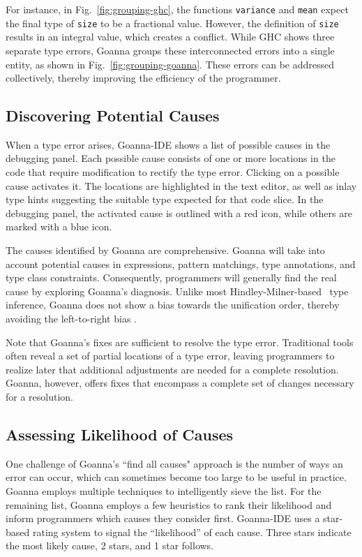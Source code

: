 \documentclass[pdflatex,lineno,sn-nature,Numbered]{sn-jnl}%
\begin{document}
    For instance, in Fig.~\ref{fig:grouping-ghc}, the functions \texttt{variance} and \texttt{mean} expect the final type of \texttt{size} to be a fractional value. However, the definition of \texttt{size} results in an integral value, which creates a conflict. While GHC shows three separate type errors, Goanna groups these interconnected errors into a single entity, as shown in Fig.~\ref{fig:grouping-goanna}. These errors can be addressed collectively, thereby improving the efficiency of the programmer.

    \subsection{Discovering Potential Causes} \label{sub:suggesting}
    When a type error arises, Goanna-IDE shows a list of possible causes in the debugging panel. Each possible cause consists of one or more locations in the code that require modification to rectify the type error. Clicking on a possible cause activates it. The locations are highlighted in the text editor, as well as inlay type hints suggesting the suitable type expected for that code slice. In the debugging panel, the activated cause is outlined with a red icon, while others are marked with a blue icon. 

    The causes identified by Goanna are comprehensive. Goanna will take into account potential causes in expressions, pattern matchings, type annotations, and type class constraints. Consequently, programmers will generally find the real cause by exploring Goanna's diagnosis. Unlike most Hindley-Milner-based~\cite{Damas1982-zw} type inference, Goanna does not show a bias towards the unification order, thereby avoiding the left-to-right bias \cite{Chen2014-ev}. 
    
    Note that Goanna's fixes are sufficient to resolve the type error. Traditional tools often reveal a set of partial locations of a type error, leaving programmers to realize later that additional adjustments are needed for a complete resolution. Goanna, however, offers fixes that encompass a complete set of changes necessary for a resolution.


    \subsection{Assessing Likelihood of Causes} \label{sub:conciseness}
    One challenge of Goanna's ``find all causes" approach is the number of ways an error can occur, which can sometimes become too large to be useful in practice. Goanna employs multiple techniques to intelligently sieve the list. For the remaining list, Goanna employs a few heuristics to rank their likelihood and inform programmers which causes they consider first. 
    Goanna-IDE uses a star-based rating system to signal the ``likelihood'' of each cause. Three stars indicate the most likely cause, 2 stars, and 1 star follows. 
\end{document}
